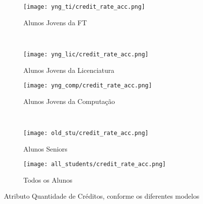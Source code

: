 \clearpage
\begin{figure}[!ht]
    \centering
    \begin{subfigure}[b]{0.48\textwidth}
        \centering
        \texttt{[image: yng\_ti/credit\_rate\_acc.png]}
        \caption{Alunos Jovens da FT}
    \end{subfigure}
    ~
    \begin{subfigure}[b]{0.48\textwidth}
        \centering
        \texttt{[image: yng\_lic/credit\_rate\_acc.png]}
        \caption{Alunos Jovens da Licenciatura}
    \end{subfigure}

    \begin{subfigure}[b]{0.48\textwidth}
        \centering
        \texttt{[image: yng\_comp/credit\_rate\_acc.png]}
        \caption{Alunos Jovens da Computação}
    \end{subfigure}
    ~
    \begin{subfigure}[b]{0.48\textwidth}
        \centering
        \texttt{[image: old\_stu/credit\_rate\_acc.png]}
        \caption{Alunos Seniors}
    \end{subfigure}

    \begin{subfigure}[b]{0.48\textwidth}
        \centering
        \texttt{[image: all\_students/credit\_rate\_acc.png]}
        \caption{Todos os Alunos}
    \end{subfigure}
    \caption{Atributo Quantidade de Créditos, conforme os diferentes modelos}
\end{figure}

